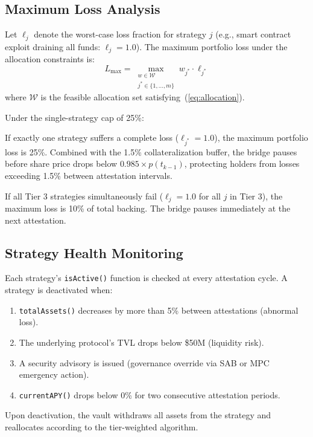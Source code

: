 \subsection{Maximum Loss Analysis}

\begin{definition}
Let $\ell_j$ denote the worst-case loss fraction for strategy $j$ (e.g., smart contract exploit draining all funds: $\ell_j = 1.0$). The maximum portfolio loss under the allocation constraints is:
\begin{equation}\label{eq:maxloss}
  L_{\max} = \max_{\substack{w \in \mathcal{W} \\ j^* \in \{1,\ldots,m\}}} w_{j^*} \cdot \ell_{j^*}
\end{equation}
where $\mathcal{W}$ is the feasible allocation set satisfying~(\ref{eq:allocation}).
\end{definition}

Under the single-strategy cap of 25\%:

\begin{corollary}
If exactly one strategy suffers a complete loss ($\ell_{j^*} = 1.0$), the maximum portfolio loss is 25\%. Combined with the 1.5\% collateralization buffer, the bridge pauses before share price drops below $0.985 \times p(t_{k-1})$, protecting holders from losses exceeding 1.5\% between attestation intervals.
\end{corollary}

\begin{corollary}
If all Tier 3 strategies simultaneously fail ($\ell_j = 1.0$ for all $j$ in Tier 3), the maximum loss is 10\% of total backing. The bridge pauses immediately at the next attestation.
\end{corollary}

\subsection{Strategy Health Monitoring}

Each strategy's \texttt{isActive()} function is checked at every attestation cycle. A strategy is deactivated when:
\begin{enumerate}[nosep]
  \item \texttt{totalAssets()} decreases by more than 5\% between attestations (abnormal loss).
  \item The underlying protocol's TVL drops below \$50M (liquidity risk).
  \item A security advisory is issued (governance override via SAB or MPC emergency action).
  \item \texttt{currentAPY()} drops below 0\% for two consecutive attestation periods.
\end{enumerate}

Upon deactivation, the vault withdraws all assets from the strategy and reallocates according to the tier-weighted algorithm.

